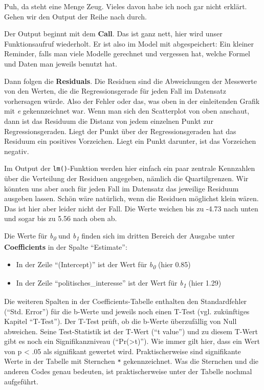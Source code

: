 \documentclass[
]{book}
\providecommand{\tightlist}{%
  \setlength{\itemsep}{0pt}\setlength{\parskip}{0pt}}
\begin{document}
Puh, da steht eine Menge Zeug. Vieles davon habe ich noch gar nicht erklärt. Gehen wir den Output der Reihe nach durch.

Der Output beginnt mit dem \textbf{Call}. Das ist ganz nett, hier wird unser Funktionsaufruf wiederholt. Er ist also im Model mit abgespeichert: Ein kleiner Reminder, falls man viele Modelle gerechnet und vergessen hat, welche Formel und Daten man jeweils benutzt hat.

Dann folgen die \textbf{Residuals}. Die Residuen sind die Abweichungen der Messwerte von den Werten, die die Regressionsgerade für jeden Fall im Datensatz vorhersagen würde. Also der Fehler oder das, was oben in der einleitenden Grafik mit \emph{e} gekennzeichnet war. Wenn man sich den Scatterplot von oben anschaut, dann ist das Residuum die Distanz von jedem einzelnen Punkt zur Regressionsgeraden. Liegt der Punkt über der Regressionsgeraden hat das Residuum ein positives Vorzeichen. Liegt ein Punkt darunter, ist das Vorzeichen negativ.

Im Output der \texttt{lm()}-Funktion werden hier einfach ein paar zentrale Kennzahlen über die Verteilung der Residuen angegeben, nämlich die Quartilgrenzen. Wir könnten uns aber auch für jeden Fall im Datensatz das jeweilige Residuum ausgeben lassen. Schön wäre natürlich, wenn die Residuen möglichst klein wären. Das ist hier aber leider nicht der Fall. Die Werte weichen bis zu -4.73 nach unten und sogar bis zu 5.56 nach oben ab.

Die Werte für \emph{b\textsubscript{0}} und \emph{b\textsubscript{1}} finden sich im dritten Bereich der Ausgabe unter \textbf{Coefficients} in der Spalte ``Estimate'':

\begin{itemize}
\tightlist
\item
  In der Zeile ``(Intercept)'' ist der Wert für \emph{b\textsubscript{0}} (hier 0.85)
\item
  In der Zeile ``politisches\_interesse'' ist der Wert für \emph{b\textsubscript{1}} (hier 1.29)
\end{itemize}

Die weiteren Spalten in der Coefficients-Tabelle enthalten den Standardfehler (``Std. Error'') für die b-Werte und jeweils noch einen T-Test (vgl. zukünftiges Kapitel ``T-Test''). Der T-Test prüft, ob die b-Werte überzufällig von Null abweichen. Seine Test-Statistik ist der T-Wert (``t value'') und zu diesem T-Wert gibt es noch ein Signifikanzniveau (``Pr(\textgreater\textbar t\textbar)''). Wie immer gilt hier, dass ein Wert von p \textless{} .05 als signifikant gewertet wird. Praktischerweise sind signifikante Werte in der Tabelle mit Sternchen \texttt{*} gekennzeichnet. Was die Sternchen und die anderen Codes genau bedeuten, ist praktischerweise unter der Tabelle nochmal aufgeführt.
\end{document}
